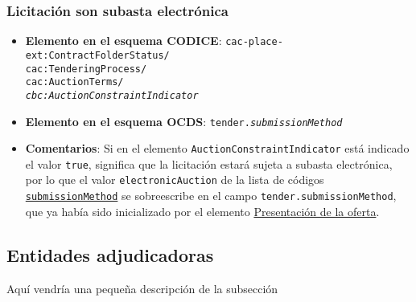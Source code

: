         \subsubsection{Licitación son subasta electrónica}
            \begin{itemize}
                \item \textbf{Elemento en el esquema CODICE}:
                    \tabto{7.6cm} \texttt{cac-place-ext:ContractFolderStatus/} \\
                    \tabto{7.6cm} \texttt{cac:TenderingProcess/} \\
                    \tabto{7.6cm} \texttt{cac:AuctionTerms/} \\
                    \tabto{7.6cm} \texttt{\textit{cbc:AuctionConstraintIndicator}}
                \item \textbf{Elemento en el esquema OCDS}:
                    \tabto{7.6cm} \texttt{tender.\textit{submissionMethod}}
                \item \textbf{Comentarios}: Si en el elemento \texttt{AuctionConstraintIndicator} está indicado el valor \texttt{true}, significa que la licitación estará sujeta a subasta electrónica, por lo que el valor \texttt{electronicAuction} de la lista de códigos \href{https://standard.open-contracting.org/latest/es/schema/codelists/#submission-method}{\texttt{submissionMethod}} se sobreescribe en el campo \texttt{tender.submissionMethod}, que ya había sido inicializado por el elemento \hyperref[subsec:PresentacionOferta]{Presentación de la oferta}.
            \end{itemize}
        
        \subsection{Entidades adjudicadoras}
    
        Aquí vendría una pequeña descripción de la subsección
    
